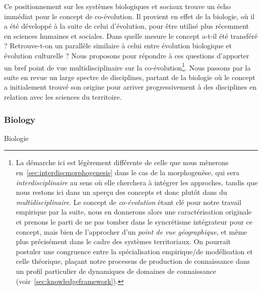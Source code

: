 {Ce positionnement sur les systèmes biologiques et sociaux trouve un écho immédiat pour le concept de co-évolution. Il provient en effet de la biologie, où il a été développé à la suite de celui d'évolution, pour être utilisé plus récemment en sciences humaines et sociales. Dans quelle mesure le concept a-t-il été transféré ? Retrouve-t-on un parallèle similaire à celui entre évolution biologique et évolution culturelle ? Nous proposons pour répondre à ces questions d'apporter un bref point de vue multidisciplinaire sur la co-évolution\footnote{La démarche ici est légèrement différente de celle que nous mènerons en~\ref{sec:interdiscmorphogenesis} dans le cas de la morphogenèse, qui sera \emph{interdisciplinaire} au sens où elle cherchera à intégrer les approches, tandis que nous restons ici dans un aperçu des concepts et donc plutôt dans du \emph{multidisciplinaire}. Le concept de \emph{co-évolution} étant clé pour notre travail empirique par la suite, nous en donnerons alors une caractérisation originale et prenons le parti de ne pas tomber dans le syncrétisme intégrateur pour ce concept, mais bien de l'approcher d'un \emph{point de vue géographique}, et même plus précisément dans le cadre des systèmes territoriaux. On pourrait postuler une congruence entre la spécialisation empirique/de modélisation et celle théorique, plaçant notre processus de production de connaissance dans un profil particulier de dynamiques de domaines de connaissance (voir~\ref{sec:knowledgeframework}).}. Nous passons par la suite en revue un large spectre de disciplines, partant de la biologie où le concept a initialement trouvé son origine pour arriver progressivement à des disciplines en relation avec les sciences du territoire.
}



\subsubsection{Biology}{Biologie}


